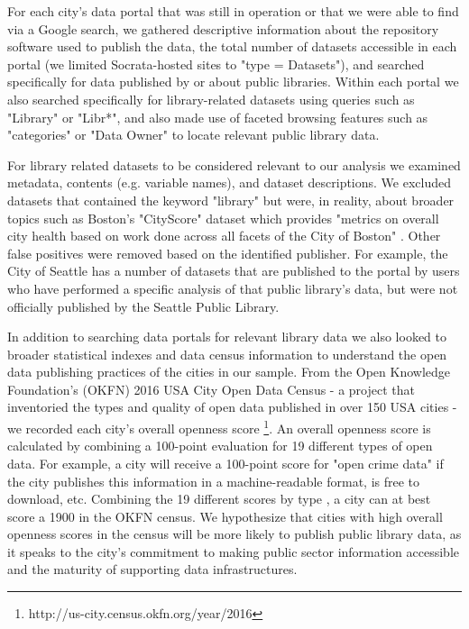 \documentclass[sigconf]{acmart}
\begin{document}
For each city's data portal that was still in operation or that we were able to find via a Google search, we gathered descriptive information about the repository software used to publish the data, the total number of datasets accessible in each portal (we limited Socrata-hosted sites to "type = Datasets"), and searched specifically for data published by or about public libraries. Within each portal we also searched specifically for library-related datasets using queries such as "Library" or "Libr*", and also made use of faceted browsing features such as "categories" or "Data Owner" to locate relevant public library data.

For library related datasets to be considered relevant to our analysis we examined metadata, contents (e.g. variable names), and dataset descriptions. We excluded datasets that contained the keyword "library" but were, in reality, about broader topics such as Boston's "CityScore" dataset which provides "metrics on overall city health based on work done across all facets of the City of Boston" \cite{cityofboston}. Other false positives were removed based on the identified publisher. For example, the City of Seattle has a number of datasets that are published to the portal by users who have performed a specific analysis of that public library's data, but were not officially published by the Seattle Public Library.

In addition to searching data portals for relevant library data we also looked to broader statistical indexes and data census information to understand the open data publishing practices of the cities in our sample. From the Open Knowledge Foundation's (OKFN) 2016 USA City Open Data Census -  a project that inventoried the types and quality of open data published in over 150 USA cities - we recorded each city's overall openness score \footnote{http://us-city.census.okfn.org/year/2016}. An overall openness score is calculated by combining a 100-point evaluation for 19 different types of open data. For example, a city will receive a 100-point score for "open crime data" if the city publishes this information in a machine-readable format, is free to download, etc. Combining the 19 different scores by type , a city can at best score a 1900 in the OKFN census. We hypothesize that cities with high overall openness scores in the census will be more likely to publish public library data, as it speaks to the city's commitment to making public sector information accessible and the maturity of supporting data infrastructures.
\end{document}
